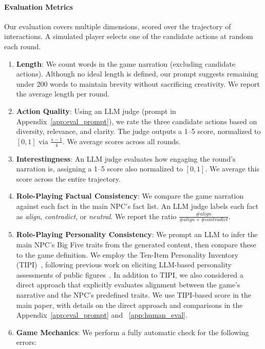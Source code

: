\paragraph{Evaluation Metrics}  
Our evaluation covers multiple dimensions, scored over the trajectory of interactions. A simulated player selects one of the candidate actions at random each round.

\begin{enumerate}
    \item \textbf{Length}: We count words in the game narration (excluding candidate actions). Although no ideal length is defined, our prompt suggests remaining under 200 words to maintain brevity without sacrificing creativity. We report the average length per round.
    \item \textbf{Action Quality}: Using an LLM judge (prompt in Appendix~\ref{app:eval_prompt}), we rate the three candidate actions based on diversity, relevance, and clarity. The judge outputs a 1--5 score, normalized to \([0,1]\) via \(\frac{s-1}{4}\). We average scores across all rounds.
    \item \textbf{Interestingness}: An LLM judge evaluates how engaging the round’s narration is, assigning a 1--5 score also normalized to \([0,1]\). We average this score across the entire trajectory.
    \item \textbf{Role-Playing Factual Consistency}: We compare the game narration against each fact in the main NPC's fact list. An LLM judge labels each fact as \textit{align}, \textit{contradict}, or \textit{neutral}. We report the ratio \(\frac{\#\textit{align}}{\#\textit{align} + \#\textit{contradict}}\).
    \item \textbf{Role-Playing Personality Consistency}: We prompt an LLM to infer the main NPC's Big Five traits from the generated content, then compare these to the game definition. We employ the Ten-Item Personality Inventory (TIPI)~\cite{gosling2003very}, following previous work on eliciting LLM-based personality assessments of public figures~\cite{cao2024large}. In addition to TIPI, we also considered a direct approach that explicitly evaluates alignment between the game’s narrative and the NPC’s predefined traits. We use TIPI-based score in the main paper, with details on the direct approach and comparisons in the Appendix~\ref{app:eval_prompt} and ~\ref{app:human_eval}.
    \item \textbf{Game Mechanics}: We perform a fully automatic check for the following errors:
    \begin{enumerate}

\end{enumerate}
\end{enumerate}
